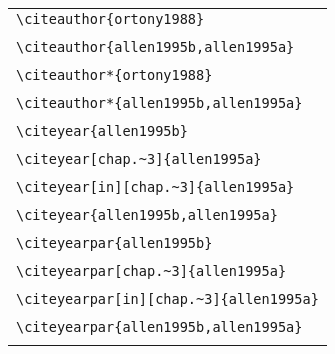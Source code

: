 \documentclass{article}
\begin{document}
\begin{center}
\begin{tabular}{l}
%
\verb#\citeauthor{ortony1988}# \\
 \citeauthor{ortony1988} \\\hline
\verb#\citeauthor{allen1995b,allen1995a}# \\
 \citeauthor{allen1995b,allen1995a} \\\hline
\verb#\citeauthor*{ortony1988}# \\
 \citeauthor*{ortony1988} \\\hline
\verb#\citeauthor*{allen1995b,allen1995a}# \\
 \citeauthor*{allen1995b,allen1995a} \\\hline\hline
%
\verb#\citeyear{allen1995b}# \\
 \citeyear{allen1995b} \\\hline
\verb#\citeyear[chap.~3]{allen1995a}# \\
 \citeyear[chap.~3]{allen1995a} \\\hline
\verb#\citeyear[in][chap.~3]{allen1995a}# \\
 \citeyear[in][chap.~3]{allen1995a} \\\hline
\verb#\citeyear{allen1995b,allen1995a}# \\
 \citeyear{allen1995b,allen1995a} \\\hline\hline
%
\verb#\citeyearpar{allen1995b}# \\
 \citeyearpar{allen1995b} \\\hline
\verb#\citeyearpar[chap.~3]{allen1995a}# \\
 \citeyearpar[chap.~3]{allen1995a} \\\hline
\verb#\citeyearpar[in][chap.~3]{allen1995a}# \\
 \citeyearpar[in][chap.~3]{allen1995a} \\\hline
\verb#\citeyearpar{allen1995b,allen1995a}# \\
 \citeyearpar{allen1995b,allen1995a} \\
\hline\hline
\end{tabular}
\end{center}
\end{document}
